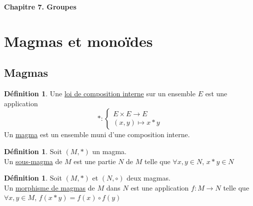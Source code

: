 \documentclass[10pt,a4paper]{article}
\theoremstyle{definition}
\newtheorem{definition}[proposition]{Définition}
\begin{document}
\renewcommand{\labelitemi}{$*$}
\renewcommand{\labelenumi}{(\roman{enumi})}
\begin{center}
{\Large \textbf{Chapitre 7. Groupes}}
\end{center}
\section{Magmas et monoïdes}
\subsection{Magmas}
\begin{definition}
Une \uline{loi de composition interne} sur un ensemble $E$ est une application
\[ *: \begin{cases}
E \times E \to E \\
(x, y) \mapsto x * y
\end{cases} \]
Un \uline{magma} est un ensemble muni d'une composition interne.
\end{definition}
\begin{definition}
Soit $(M, *)$ un magma. \\
Un \uline{sous-magma} de $M$ est une partie $N$ de $M$ telle que $\forall x, y \in N$, $x * y \in N$
\end{definition}
\begin{definition}
Soit $(M, *)$ et $(N, \circ)$ deux magmas. \\
Un \uline{morphisme de magmas} de $M$ dans $N$ est une application $f: M \to N$ telle que \\
$\forall x, y \in M$, $f(x * y) = f(x) \circ f(y)$
\end{definition}
\end{document}

